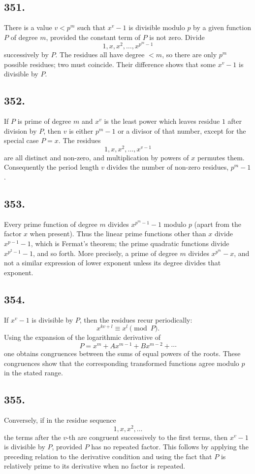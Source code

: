 \documentclass[12pt]{article}
\begin{document}
\subsection*{351.}
There is a value $v<p^m$ such that $x^v-1$ is divisible modulo $p$ by a given function $P$ of degree $m$, provided the constant term of $P$ is not zero. Divide
\[
1,x,x^2,\ldots,x^{p^m-1}
\]
successively by $P$. The residues all have degree $<m$, so there are only $p^m$ possible residues; two must coincide. Their difference shows that some $x^v-1$ is divisible by $P$.

\subsection*{352.}
If $P$ is prime of degree $m$ and $x^v$ is the least power which leaves residue $1$ after division by $P$, then $v$ is either $p^m-1$ or a divisor of that number, except for the special case $P=x$. The residues
\[
1,x,x^2,\ldots,x^{v-1}
\]
are all distinct and non-zero, and multiplication by powers of $x$ permutes them. Consequently the period length $v$ divides the number of non-zero residues, $p^m-1$.

\subsection*{353.}
Every prime function of degree $m$ divides $x^{p^m-1}-1$ modulo $p$ (apart from the factor $x$ when present). Thus the linear prime functions other than $x$ divide $x^{p-1}-1$, which is Fermat's theorem; the prime quadratic functions divide $x^{p^2-1}-1$, and so forth. More precisely, a prime of degree $m$ divides $x^{p^m}-x$, and not a similar expression of lower exponent unless its degree divides that exponent.

\subsection*{354.}
If $x^v-1$ is divisible by $P$, then the residues recur periodically:
\[
x^{kv+l}\equiv x^l\pmod P.
\]
Using the expansion of the logarithmic derivative of
\[
P=x^m+Ax^{m-1}+Bx^{m-2}+\cdots
\]
one obtains congruences between the sums of equal powers of the roots. These congruences show that the corresponding transformed functions agree modulo $p$ in the stated range.

\subsection*{355.}
Conversely, if in the residue sequence
\[
1,x,x^2,\ldots
\]
the terms after the $v$-th are congruent successively to the first terms, then $x^v-1$ is divisible by $P$, provided $P$ has no repeated factor. This follows by applying the preceding relation to the derivative condition and using the fact that $P$ is relatively prime to its derivative when no factor is repeated.
\end{document}
